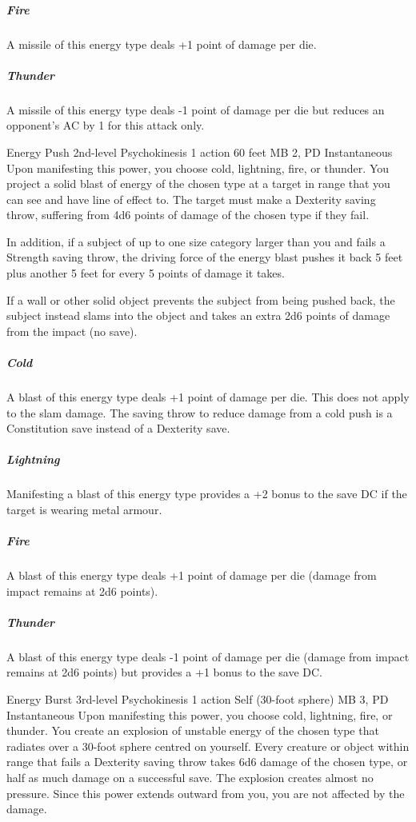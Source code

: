   \subparagraph{Fire}
  A missile of this energy type deals +1 point of damage per die.
  
  \subparagraph{Thunder}
  A missile of this energy type deals -1 point of damage per die
  but reduces an opponent's AC by 1 for this attack only.

\DndPowerHeader%
  {Energy Push}
  {2nd-level Psychokinesis}
  {1 action}
  {60 feet}
  {MB 2, PD \lvltwo}
  {Instantaneous}
  Upon manifesting this power, you choose cold, lightning, fire, or thunder.
  You project a solid blast of energy of the chosen type at a target in range
  that you can see and have line of effect to.
  The target must make a Dexterity saving throw,
  suffering from 4d6 points of damage of the chosen type if they fail.
  
  In addition, if a subject of up to one size category larger than you
  and fails a Strength saving throw,
  the driving force of the energy blast pushes it back 5 feet
  plus another 5 feet for every 5 points of damage it takes.
  
  If a wall or other solid object prevents the subject from being pushed back,
  the subject instead slams into the object and takes an extra
  2d6 points of damage from the impact (no save).
  \subparagraph{Cold}
    A blast of this energy type deals +1 point of damage per die.
    This does not apply to the slam damage.
    The saving throw to reduce damage from a cold push
    is a Constitution save instead of a Dexterity save.
  \subparagraph{Lightning}
    Manifesting a blast of this energy type provides a +2 bonus
    to the save DC if the target is wearing metal armour.
  \subparagraph{Fire}
    A blast of this energy type deals +1 point of damage per die
    (damage from impact remains at 2d6 points).
  \subparagraph{Thunder}
    A blast of this energy type deals -1 point of damage per die
    (damage from impact remains at 2d6 points)
    but provides a +1 bonus to the save DC.

\DndPowerHeader%
  {Energy Burst}
  {3rd-level Psychokinesis}
  {1 action}
  {Self (30-foot sphere)}
  {MB 3, PD \lvlthree}
  {Instantaneous}
Upon manifesting this power, you choose cold, lightning,
fire, or thunder.
You create an explosion of unstable energy of the chosen type
that radiates over a 30-foot sphere
centred on yourself.
Every creature or object within range that fails a Dexterity saving throw
takes 6d6 damage of the chosen type,
or half as much damage on a successful save.
The explosion creates almost no pressure.
Since this power extends outward from you,
you are not affected by the damage.

